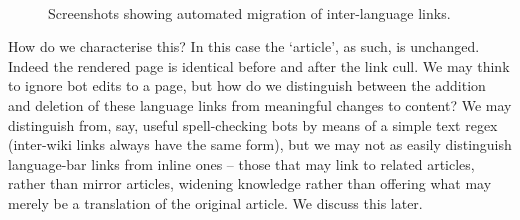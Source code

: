 \begin{figure}
  \centering {}\\ 
  \vspace{8mm}
\caption{Screenshots showing automated migration of inter-language
  links.}
\label{fig:traj-bot-explanation}
\end{figure}

How do we characterise this? In this case the `article', as such, is
unchanged. Indeed the rendered page is identical before and after the
link cull. We may think to ignore bot edits to a page, but how do we
distinguish between the addition and deletion of these language links
from meaningful changes to content? We may distinguish from, say,
useful spell-checking bots by means of a simple text regex (inter-wiki
links always have the same form), but we may not as easily distinguish
language-bar links from inline ones -- those that may link to related
articles, rather than mirror articles, widening knowledge rather than
offering what may merely be a translation of the original
article. We discuss this later.

